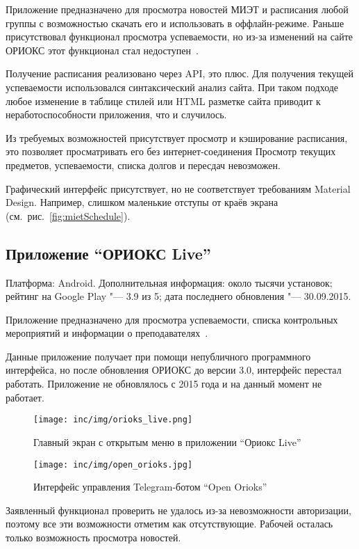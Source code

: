 Приложение предназначено для просмотра новостей МИЭТ и расписания любой группы с возможностью скачать его и использовать в оффлайн-режиме.
Раньше присутствовал функционал просмотра успеваемости, но из-за изменений на сайте ОРИОКС этот функционал стал недоступен~\cite{market:mietSchedule}.

Получение расписания реализовано через API, это плюс.
Для получения текущей успеваемости использовался синтаксический анализ сайта.
При таком подходе любое изменение в таблице стилей или HTML разметке сайта приводит к неработоспособности приложения, что и случилось.

Из требуемых возможностей присутствует просмотр и кэширование расписания, это позволяет просматривать его без интернет-соединения
Просмотр текущих предметов, успеваемости, списка долгов и пересдач невозможен.

Графический интерфейс присутствует, но не соответствует требованиям Material Design.
Например, слишком маленькие отступы от краёв экрана (см.~рис.~\ref{fig:mietSchedule}).

\subsection{Приложение ``ОРИОКС Live''}
\label{subsec:appOrioksLive}
Платформа: Android.
Дополнительная информация: около тысячи установок;
рейтинг на Google Play "--- 3.9 из 5;
дата последнего обновления "--- 30.09.2015.

Приложение предназначено для просмотра успеваемости, списка контрольных мероприятий и информации о преподавателях~\cite{market:orioksLive}.

Данные приложение получает при помощи непубличного программного интерфейса, но после обновления ОРИОКС до версии 3.0, интерфейс перестал работать.
Приложение не обновлялось с 2015 года и на данный момент не работает.

\begin{figure}[ht]
    \texttt{[image: inc/img/orioks\_live.png]}
    \caption{Главный экран с открытым меню в приложении ``Ориокс Live''}
    \label{fig:orioksLive}
  \endminipage\hfill
  \centering
    \texttt{[image: inc/img/open\_orioks.jpg]}
    \caption{Интерфейс управления Telegram-ботом ``Open Orioks''}
    \label{fig:openOrioks}
  \endminipage
\end{figure}

Заявленный функционал проверить не удалось из-за невозможности авторизации, поэтому все эти возможности отметим как отсутствующие.
Рабочей осталась только возможность просмотра новостей.

